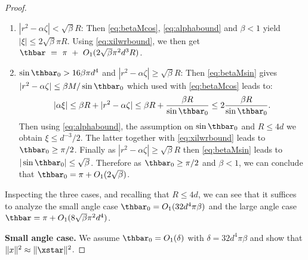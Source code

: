\begin{proof}
\begin{enumerate}
		\item ${|r^2 - \alpha \zeta| <  \sqrt{\beta}R}$: Then \eqref{eq:betaMcos}, \eqref{eq:alphabound} and $\beta < 1$ yield $|\xi| \leq 2 \sqrt{\beta} \pi R$. Using \eqref{eq:xilwrbound}, we then get \\$\thbar~=~\pi~+~O_1(2 \sqrt{\beta} \pi^2 d^3 R)$.
		
		\item ${\sin \thbar_0 > 16 \beta \pi d^4}$ and $|r^2 - \alpha \zeta| \geq \sqrt{\beta}R$: Then \eqref{eq:betaMsin} gives $|r^2 - \alpha \zeta| \leq \beta M/\sin \thbar_0$ which used with \eqref{eq:betaMcos} leads to:
		\[
		|\alpha \xi| \leq \beta R + |r^2 - \alpha \zeta| \leq  \beta R +  \frac{\beta R}{\sin \thbar_0}  \leq 2 \frac{\beta R}{\sin \thbar_0}.
		\]
		Then using \eqref{eq:alphabound}, the assumption on $\sin \thbar_0$ and $R \leq 4 d$ we obtain $\xi \leq d^{-3}/2$. The latter together with \eqref{eq:xilwrbound} leads to $\thbar_0 \geq \pi/2$. 
		Finally as $|r^2 - \alpha \zeta| \geq \sqrt{\beta}R $ then \eqref{eq:betaMsin} leads to $|\sin \thbar_0| \leq \sqrt{\beta}$. Therefore as $\thbar_0 \geq \pi/2$ and $\beta < 1$, we can conclude that $\thbar_0 = \pi + O_1(2 \sqrt{\beta})$.
	\end{enumerate}
	\bigskip
	
	\noindent Inspecting the three cases, and recalling that $R \leq 4 d$, we can see that it suffices to analyze the small angle case $\thbar_0 = O_1(32 d^4 \pi \beta)$ and the large angle case $\thbar = \pi + O_1(8 \sqrt{\beta}  \pi^2 d^4)$.
	
	\medskip
	\noindent\textbf{Small angle case.}
	We assume $\thbar_0 = O_1(\delta)$ with $\delta = 32 d^4 \pi \beta$ and show that $\|x\|^2 \approx \|\xstar\|^2$.
	

\end{proof}
